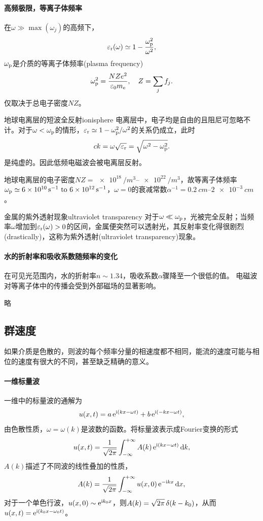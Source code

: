 \paragraph{高频极限，等离子体频率}
在$\omega\gg\max(\omega_j)$的高频下，
\[
    \varepsilon_\text r(\omega)\simeq 1-\frac{\omega_\text p^2}{\omega^2},
\]
$\omega_\text p$是介质的等离子体频率(plasma frequency)
\begin{equation}
    \omega_\text p^2=\frac{NZe^2}{\varepsilon_0m_\mathrm e},\quad Z=\sum_jf_j.
\end{equation}
仅取决于总电子密度$NZ$。
\begin{example}{地球电离层的短波全反射}{ionisphere}
    电离层中，电子均是自由的且阻尼可忽略不计。对于$\omega<\omega_\text p$的情形，$\varepsilon_\text r\simeq 1-\omega_\text p^2/\omega^2$的关系仍成立，此时
    \[
        ck=\omega\sqrt{\varepsilon_\text r}=\sqrt{\omega^2-\omega_\text p^2}.
    \]
    是纯虚的。因此低频电磁波会被电离层反射。

    地球电离层的电子密度$NZ=\SIrange{e18}{e22}{/m^3}$，故等离子体频率$\omega_\text p\simeq\SIrange{6e10}{6e12}{s^{-1}}$，$\omega=0$的衰减常数$\alpha^{-1}=\SIrange{0.2}{2e-3}{cm}$。
\end{example}
\begin{example}{金属的紫外透射现象}{ultraviolet transparency}
    对于$\omega\ll\omega_\text p$，光被完全反射；当频率$\omega$增加到$\varepsilon_\text r(\omega)>0$的区间，金属便突然可以透射光，其反射率变化得很剧烈(drastically)，这称为紫外透射(ultraviolet transparency)现象。
\end{example}
\paragraph{水的折射率和吸收系数随频率的变化}
在可见光范围内，水的折射率$n\sim 1.34$，吸收系数$\alpha$骤降至一个很低的值。
电磁波对等离子体中的传播会受到外部磁场的显著影响。

略
\clearpage
\subsection{群速度}
如果介质是色散的，则波的每个频率分量的相速度都不相同，能流的速度可能与相位的速度有很大的不同，甚至缺乏精确的意义。
\paragraph{一维标量波}
一维中的标量波的通解为
\[
    u(x,t)=a\mathop{}\!\mathrm{e}^{\mathrm{i}(kx-\omega t)}+b\mathop{}\!\mathrm{e}^{\mathrm{i}(-kx-\omega t)},
\]
由色散性质，$\omega=\omega(k)$是波数的函数。将标量波表示成Fourier变换的形式
\[
    u(x,t)=\frac1{\sqrt{2\pi}}\int_{-\infty}^{+\infty} A(k)\mathop{}\!\mathrm{e}^{\mathrm{i}(kx-\omega t)}\mathop{}\!\mathrm{d} k,
\]
$A(k)$描述了不同波的线性叠加的性质，
\[
    A(k)=\frac1{\sqrt{2\pi}}\int_{-\infty}^{+\infty} u(x,0)\mathop{}\!\mathrm{e}^{-\mathrm{i} kx}\mathop{}\!\mathrm{d} x,
\]
对于一个单色行波，$u(x,0)\sim\mathop{}\!\mathrm{e}^{\mathrm{i} k_0x}$，则$A(k)=\sqrt{2\pi}\mathop{}\!\delta(k-k_0)$，从而$u(x,t)=\mathop{}\!\mathrm{e}^{\mathrm{i}(k_0x-\omega_0t)}$。
